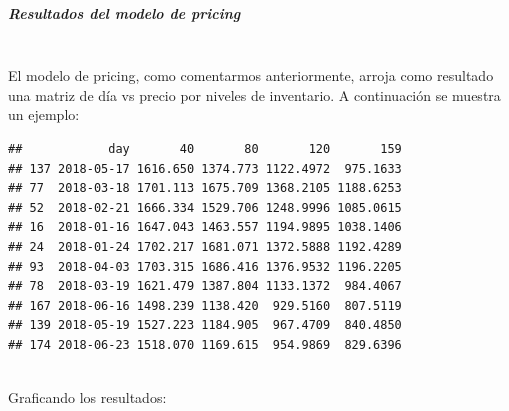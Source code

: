 \documentclass{article}\usepackage[]{graphicx}\usepackage[]{color}
\makeatletter
\newenvironment{kframe}{%
 \def\at@end@of@kframe{}%
 \ifinner\ifhmode%
  \def\at@end@of@kframe{\end{minipage}}%
  \begin{minipage}{\columnwidth}%
 \fi\fi%
 \def\FrameCommand##1{\hskip\@totalleftmargin \hskip-\fboxsep
 \colorbox{shadecolor}{##1}\hskip-\fboxsep
     \hskip-\linewidth \hskip-\@totalleftmargin \hskip\columnwidth}%
 \MakeFramed {\advance\hsize-\width
   \@totalleftmargin\z@ \linewidth\hsize
   \@setminipage}}%
 {\par\unskip\endMakeFramed%
 \at@end@of@kframe}
\newenvironment{knitrout}{}{} %
\makeatother
\begin{document}
\begin{knitrout}
\color{fgcolor}\begin{kframe}


{\ttfamily\noindent\bfseries{}}\end{kframe}
\end{knitrout}
\subparagraph{Resultados del modelo de pricing}~\\
El modelo de pricing, como comentarmos anteriormente, arroja como resultado una matriz de día vs precio por niveles de inventario. A continuación se muestra un ejemplo:
~\\
\begin{knitrout}
\color{fgcolor}\begin{kframe}
\begin{verbatim}
##            day       40       80       120       159
## 137 2018-05-17 1616.650 1374.773 1122.4972  975.1633
## 77  2018-03-18 1701.113 1675.709 1368.2105 1188.6253
## 52  2018-02-21 1666.334 1529.706 1248.9996 1085.0615
## 16  2018-01-16 1647.043 1463.557 1194.9895 1038.1406
## 24  2018-01-24 1702.217 1681.071 1372.5888 1192.4289
## 93  2018-04-03 1703.315 1686.416 1376.9532 1196.2205
## 78  2018-03-19 1621.479 1387.804 1133.1372  984.4067
## 167 2018-06-16 1498.239 1138.420  929.5160  807.5119
## 139 2018-05-19 1527.223 1184.905  967.4709  840.4850
## 174 2018-06-23 1518.070 1169.615  954.9869  829.6396
\end{verbatim}
\end{kframe}
\end{knitrout}
~\\
Graficando los resultados:
~\\
\end{document}
